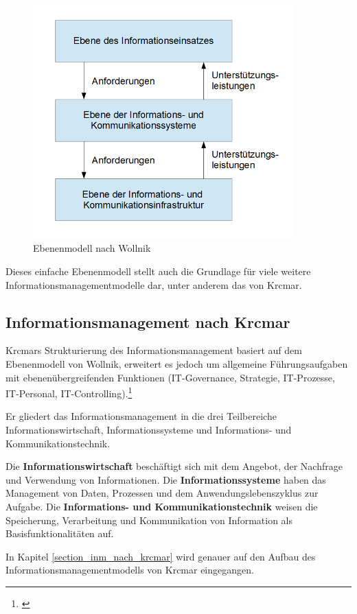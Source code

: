 \begin{figure}[h!]
	\centering
	\includegraphics[width=10cm]{kapitel/gruppe1_1/bilder/ebenenmodell_wollnik}
	\caption{Ebenenmodell nach Wollnik}
	\label{fig_ebenenmodell_wollnik}
\end{figure}

Dieses einfache Ebenenmodell stellt auch die Grundlage für viele weitere Informationsmanagementmodelle dar, unter anderem das von Krcmar.

\subsection{Informationsmanagement nach Krcmar}
Krcmars Strukturierung des Informationsmanagement basiert auf dem Ebenenmodell von Wollnik, erweitert es jedoch um allgemeine Führungsaufgaben mit ebenenübergreifenden Funktionen (IT-Governance, Strategie, IT-Prozesse, IT-Personal, IT-Controlling).\footnote{\cite{krcmar_informationsmanagement_2015}}

Er gliedert das Informationsmanagement in die drei Teilbereiche Informationswirtschaft, Informationssysteme und Informations- und Kommunikationstechnik.

Die \textbf{Informationswirtschaft} beschäftigt sich mit dem Angebot, der Nachfrage und Verwendung von Informationen.
Die \textbf{Informationssysteme} haben das Management von Daten, Prozessen und dem Anwendungslebenszyklus zur Aufgabe.
Die \textbf{Informations- und Kommunikationstechnik} weisen die Speicherung, Verarbeitung und Kommunikation von Information als Basisfunktionalitäten auf.

In Kapitel \ref{section_inm_nach_krcmar} wird genauer auf den Aufbau des Informationsmanagementmodells von Krcmar eingegangen.

